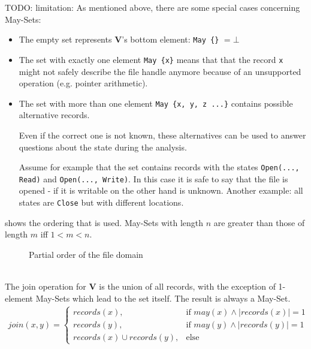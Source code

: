 TODO: limitation: %
As mentioned above, there are some special cases concerning May-Sets:
\begin{itemize}
\item The empty set represents \textbf{V}'s bottom element: \verb|May {}| $ = \bot$
\item The set with exactly one element \verb|May {x}| means that that the record \verb|x| might not safely describe the file handle anymore because of an unsupported operation (e.g. pointer arithmetic).
\item The set with more than one element \verb|May {x, y, z ...}| contains possible alternative records. 

Even if the correct one is not known, these alternatives can be used to answer questions about the state during the analysis.

Assume for example that the set contains records with the states \verb|Open(..., Read)| and \verb|Open(..., Write)|. In this case it is safe to say that the file is opened - if it is writable on the other hand is unknown. Another example: all states are \verb|Close| but with different locations. %
\end{itemize}
 shows the ordering that is used. May-Sets with length $n$ are greater than those of length $m$ iff $1<m<n$.
\begin{figure}[ht]
  \centering
{}
  \caption{Partial order of the file domain}
  \label{fig:fileDomain}
\end{figure}\\
The join operation for \textbf{V} is the union of all records, with the exception of 1-element May-Sets which lead to the set itself. The result is always a May-Set.
\begin{align*}
join(x,y)=\left\{\begin{array}{cl}
records(x), & \mbox{if }may(x) \wedge |records(x)|=1\\
records(y), & \mbox{if }may(y) \wedge |records(y)|=1\\
records(x) \cup records(y), & \mbox{else} \end{array}\right.
\end{align*}


